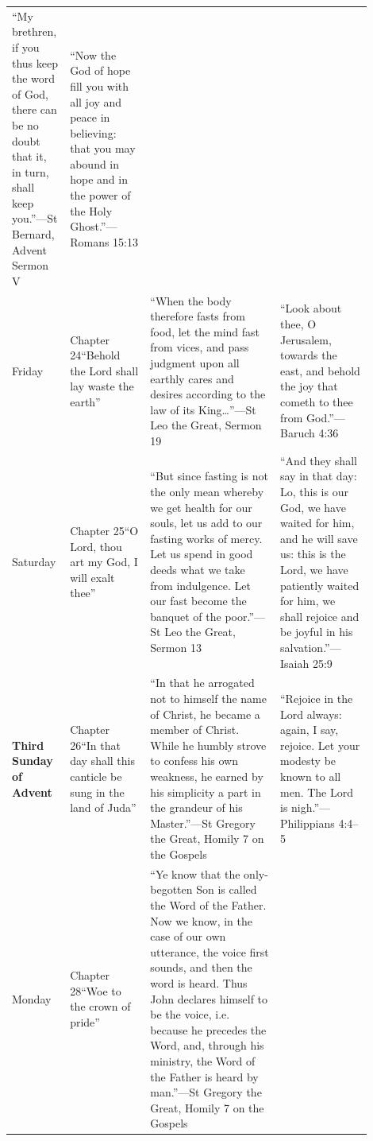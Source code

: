 {\begin{longtable}{@{}>{\raggedright\arraybackslash}p{0.11\linewidth}>{\raggedright\arraybackslash}p{0.21\linewidth}>{\raggedright\arraybackslash}p{0.34\linewidth}>{\raggedright\arraybackslash}p{0.24\linewidth}@{}}
``My brethren, if you thus keep the word of God, there can be no doubt that it, in turn, shall keep you.''\newline---St Bernard, Advent Sermon V &
``Now the God of hope fill you with all joy and peace in believing: that you may abound in hope and in the power of the Holy Ghost.''\newline---Romans 15:13\\
\addlinespace
Friday &
Chapter 24\newline ``Behold the Lord shall lay waste the earth'' &
``When the body therefore fasts from food, let the mind fast from vices, and pass judgment upon all earthly cares and desires according to the law of its King\dots''\newline---St Leo the Great, Sermon 19 &
``Look about thee, O Jerusalem, towards the east, and behold the joy that cometh to thee from God.''\newline---Baruch 4:36\\
\addlinespace
Saturday &
Chapter 25\newline ``O Lord, thou art my God, I will exalt thee'' &
``But since fasting is not the only mean whereby we get health for our souls, let us add to our fasting works of mercy. Let us spend in good deeds what we take from indulgence. Let our fast become the banquet of the poor.''\newline---St Leo the Great, Sermon 13 &
``And they shall say in that day: Lo, this is our God, we have waited for him, and he will save us: this is the Lord, we have patiently waited for him, we shall rejoice and be joyful in his salvation.''\newline---Isaiah 25:9\\
\addlinespace[1em]
\textbf{Third Sunday of Advent} &
Chapter 26\newline ``In that day shall this canticle be sung in the land of Juda'' &
``In that he arrogated not to himself the name of Christ, he became a member of Christ. While he humbly strove to confess his own weakness, he earned by his simplicity a part in the grandeur of his Master.''\newline---St Gregory the Great, Homily 7 on the Gospels &
``Rejoice in the Lord always: again, I say, rejoice. Let your modesty be known to all men. The Lord is nigh.''\newline---Philippians 4:4--5\\
\addlinespace
Monday &
Chapter 28\newline ``Woe to the crown of pride'' &
``Ye know that the only-begotten Son is called the Word of the Father. Now we know, in the case of our own utterance, the voice first sounds, and then the word is heard. Thus John declares himself to be the voice, i.e. because he precedes the Word, and, through his ministry, the Word of the Father is heard by man.''\newline---St Gregory the Great, Homily 7 on the Gospels &

\end{longtable}}
